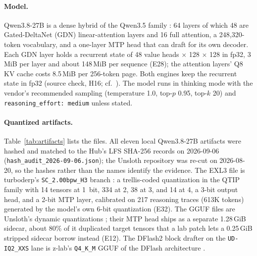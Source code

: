 \documentclass[11pt]{article}
\newcommand{\q}[1]{\texttt{#1}}
\begin{document}
\paragraph{Model.}
Qwen3.8-27B is a dense hybrid of the Qwen3.5 family \citep{qwen2026qwen38card}:
64 layers of which 48 are Gated-DeltaNet (GDN) linear-attention layers
\citep{yang2024gated} and 16 full attention, a 248,320-token vocabulary, and a
one-layer MTP head that can draft for its own decoder. Each GDN layer holds a
recurrent state of 48 value heads $\times$ 128 $\times$ 128 in fp32, 3\,MiB
per layer and about 148\,MiB per sequence (E28); the attention layers' Q8 KV
cache costs 8.5\,MiB per 256-token page. Both engines keep the recurrent
state in fp32 (source check, H16; cf.\ \citealp{zhang2026damp}). The model
runs in thinking mode with the vendor's recommended sampling (temperature
1.0, top-$p$ 0.95, top-$k$ 20) and \q{reasoning\_effort: medium} unless
stated.

\paragraph{Quantized artifacts.}
Table~\ref{tab:artifacts} lists the files. All eleven local Qwen3.8-27B
artifacts were hashed and matched to the Hub's LFS SHA-256 records on
2026-09-06 (\q{hash\_audit\_2026-09-06.json}); the Unsloth repository was
re-cut on 2026-08-20, so the hashes rather than the names identify the
evidence. The EXL3 file is turboderp's \q{SC\_2.00bpw\_H3} branch
\citep{turboderp2026qwen38exl3}: a trellis-coded quantization in the QTIP
family \citep{tseng2024qtip} with 14 tensors at 1~bit, 334 at 2, 38 at 3,
and 14 at 4, a 3-bit output head, and a 2-bit MTP layer, calibrated on 217
reasoning traces (613K tokens) generated by the model's own 6-bit
quantization (E32). The GGUF files are Unsloth's dynamic quantizations
\citep{unsloth2026qwen38gguf}; their MTP head ships as a separate 1.28\,GiB
sidecar, about 80\% of it duplicated target tensors that a lab patch lets a
0.25\,GiB stripped sidecar borrow instead (E12). The DFlash2 block drafter on
the \q{UD-IQ2\_XXS} lane is z-lab's \q{Q4\_K\_M} GGUF of the DFlash
architecture \citep{chen2026dflash,zlab2026dflash2gguf}.
\end{document}
